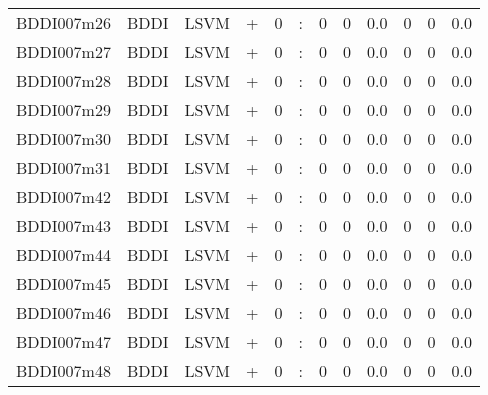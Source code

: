 \documentclass[a4paper]{article}
\begin{document}
\begin{landscape}
\begin{center}
\begin{tabular}{ |c|c|c|c|c|c|c|c|c|c|c|c|}
 
 	
 	\small{ BDDI007m26 } & BDDI & LSVM & +  &  0 &  :  &  0 & 0 & 0.0  &  0 & 0 & 0.0 \\
 	

 
 	
 	\small{ BDDI007m27 } & BDDI & LSVM & +  &  0 &  :  &  0 & 0 & 0.0  &  0 & 0 & 0.0 \\
 	

 
 	
 	\small{ BDDI007m28 } & BDDI & LSVM & +  &  0 &  :  &  0 & 0 & 0.0  &  0 & 0 & 0.0 \\
 	

 
 	
 	\small{ BDDI007m29 } & BDDI & LSVM & +  &  0 &  :  &  0 & 0 & 0.0  &  0 & 0 & 0.0 \\
 	

 
 	
 	\small{ BDDI007m30 } & BDDI & LSVM & +  &  0 &  :  &  0 & 0 & 0.0  &  0 & 0 & 0.0 \\
 	

 
 	
 	\small{ BDDI007m31 } & BDDI & LSVM & +  &  0 &  :  &  0 & 0 & 0.0  &  0 & 0 & 0.0 \\
 	

 
 	
 	\small{ BDDI007m42 } & BDDI & LSVM & +  &  0 &  :  &  0 & 0 & 0.0  &  0 & 0 & 0.0 \\
 	

 
 	
 	\small{ BDDI007m43 } & BDDI & LSVM & +  &  0 &  :  &  0 & 0 & 0.0  &  0 & 0 & 0.0 \\
 	

 
 	
 	\small{ BDDI007m44 } & BDDI & LSVM & +  &  0 &  :  &  0 & 0 & 0.0  &  0 & 0 & 0.0 \\
 	

 
 	
 	\small{ BDDI007m45 } & BDDI & LSVM & +  &  0 &  :  &  0 & 0 & 0.0  &  0 & 0 & 0.0 \\
 	

 
 	
 	\small{ BDDI007m46 } & BDDI & LSVM & +  &  0 &  :  &  0 & 0 & 0.0  &  0 & 0 & 0.0 \\
 	

 
 	
 	\small{ BDDI007m47 } & BDDI & LSVM & +  &  0 &  :  &  0 & 0 & 0.0  &  0 & 0 & 0.0 \\
 	

 
 	
 	\small{ BDDI007m48 } & BDDI & LSVM & +  &  0 &  :  &  0 & 0 & 0.0  &  0 & 0 & 0.0 \\
 	


\end{tabular}
\end{center}
\end{landscape}
\end{document}
